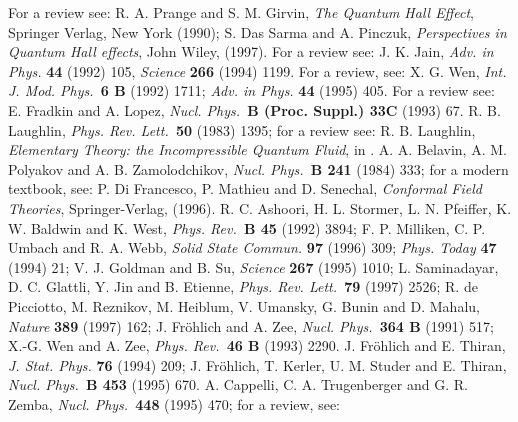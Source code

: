   
 
%
%
\def\NP{{\it Nucl. Phys.\ }}
\def\PRL{{\it Phys. Rev. Lett.\ }}
\def\PL{{\it Phys. Lett.\ }}
\def\PR{{\it Phys. Rev.\ }}
\def\CMP{{\it Comm. Math. Phys.\ }}
\def\IJMP{{\it Int. J. Mod. Phys.\ }}
\def\MPL{{\it Mod. Phys. Lett.\ }}
\def\RMP{{\it Rev. Mod. Phys.\ }}
\def\AP{{\it Ann. Phys.\ }}
%
\begin{thebibliography}{99}
 For a review see: R. A. Prange and S. M. Girvin, {\it The Quantum
                Hall Effect}, Springer Verlag, New York (1990);
                S. Das Sarma and A. Pinczuk, {\it Perspectives 
                in Quantum Hall effects}, John Wiley, (1997).
  For a review see: J. K. Jain, {\it Adv. in Phys.} {\bf 44}
                (1992) 105, {\it Science} {\bf 266} (1994) 1199.
   For a review, see: 
                X. G. Wen, \IJMP {\bf 6 B} (1992) 1711; {\it Adv. in Phys.} {\bf
                44} (1995) 405.
 For a review see: E. Fradkin and A. Lopez,
                \NP {\bf B (Proc. Suppl.) 33C} (1993) 67.
 R. B. Laughlin, \PRL {\bf 50} (1983) 1395;
                for a review see: R. B. Laughlin, {\it Elementary Theory: the
                Incompressible Quantum Fluid}, in \cite{prange}.
   A. A. Belavin, A. M. Polyakov and A. B. Zamolodchikov,
                \NP {\bf B 241} (1984) 333; for a modern textbook, see:
                P. Di Francesco, P. Mathieu and D. Senechal,
		{\it Conformal Field Theories}, Springer-Verlag, (1996). 
  R. C. Ashoori, H. L. Stormer, L. N. Pfeiffer, K. W. Baldwin
                and K. West, \PR {\bf B 45} (1992) 3894;
                F. P. Milliken, C. P. Umbach and R. A. Webb, 
                {\it Solid State Commun.} {\bf 97} (1996) 309;
                {\it Phys. Today} {\bf 47} (1994) 21;
                V. J. Goldman and B. Su, {\it Science} {\bf 267} (1995) 1010; 
		L. Saminadayar, D. C. Glattli, Y. Jin and
                B. Etienne, \PRL {\bf 79} (1997) 2526;
                R. de Picciotto, M. Reznikov, M. Heiblum, V. Umansky,
                G. Bunin and D. Mahalu, {\it Nature} {\bf 389} (1997) 162;
   J. Fr\"ohlich and A. Zee, \NP {\bf 364 B} (1991) 517; 
                X.-G. Wen and A. Zee, \PR {\bf 46 B} (1993) 2290.
                J. Fr\"ohlich and E. Thiran, {\it J. Stat. Phys.}
                {\bf 76} (1994) 209; J. Fr\"ohlich, T. Kerler, U. M. Studer 
                and E. Thiran, \NP {\bf B 453} (1995) 670.
  A. Cappelli, C. A. Trugenberger and G. R. Zemba,
                \NP {\bf 448} (1995) 470; for a review, see: 

\end{thebibliography}
